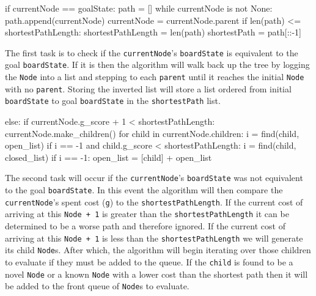 \documentclass[12pt, letterpaper, final, onecolumn, titlepage] {article}
\begin{document}
\begin{python}
if currentNode == goalState:                                                  
path = []
while currentNode is not None:
    path.append(currentNode)
    currentNode = currentNode.parent
if len(path) <= shortestPathLength:
    shortestPathLength = len(path)
shortestPath = path[::-1]
\end{python}
\newpage
\noindent The first task is to check if the \texttt{currentNode}'s \texttt{boardState} is equivalent to the goal \texttt{boardState}. 
If it is then the algorithm will walk back up the tree by logging the \texttt{Node} into a list and stepping to each \texttt{parent} until it reaches the initial \texttt{Node} with no \texttt{parent}.  Storing the inverted list will store a list ordered from initial \texttt{boardState} to goal \texttt{boardState} in the \texttt{shortestPath} list.
\vspace{0.4cm}
\begin{python}
else:                                                                               
    if currentNode.g_score + 1 < shortestPathLength:
        currentNode.make_children()                                                 
        for child in currentNode.children:
            i = find(child, open_list)                                              
            if i == -1 and child.g_score < shortestPathLength:
                i = find(child, closed_list)                                        
                if i == -1:
                    open_list = [child] + open_list 
\end{python}

\noindent The second task will occur if the \texttt{currentNode}'s \texttt{boardState} was not equivalent to the goal \texttt{boardState}.
In this event the algorithm will then compare the \texttt{currentNode}'s spent cost (\texttt{g}) to the \texttt{shortestPathLength}.  
If the current cost of arriving at this \texttt{Node + 1} is greater than the \texttt{shortestPathLength} it can be determined to be a worse path and therefore ignored.  If the current cost of arriving at this \texttt{Node + 1} is less than the \texttt{shortestPathLength} we will generate its child \texttt{Node}s. After which, the algorithm will begin iterating over those children to evaluate if they must be added to the queue.
If the \texttt{child} is found to be a novel \texttt{Node} or a known \texttt{Node} with a lower cost than the shortest path then it will be added to the front queue of \texttt{Node}s to evaluate.
\newpage
\end{document}
